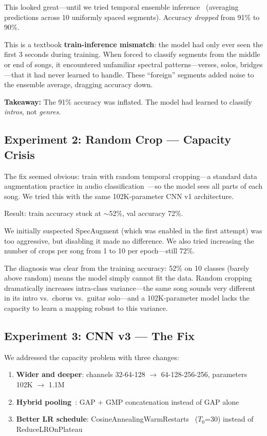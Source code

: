 This looked great---until we tried temporal ensemble inference~\cite{silla2007ensemble} (averaging predictions across 10 uniformly spaced segments). Accuracy \emph{dropped} from 91\% to 90\%.

This is a textbook \textbf{train-inference mismatch}: the model had only ever seen the first 3 seconds during training. When forced to classify segments from the middle or end of songs, it encountered unfamiliar spectral patterns---verses, solos, bridges---that it had never learned to handle. These ``foreign'' segments added noise to the ensemble average, dragging accuracy down.

\textbf{Takeaway:} The 91\% accuracy was inflated. The model had learned to classify \emph{intros}, not \emph{genres}.

\subsection{Experiment 2: Random Crop --- Capacity Crisis}
\label{sec:evolution}

The fix seemed obvious: train with random temporal cropping---a standard data augmentation practice in audio classification~\cite{dieleman2014end}---so the model sees all parts of each song. We tried this with the same 102K-parameter CNN v1 architecture.

Result: train accuracy stuck at $\sim$52\%, val accuracy 72\%.

We initially suspected SpecAugment (which was enabled in the first attempt) was too aggressive, but disabling it made no difference. We also tried increasing the number of crops per song from 1 to 10 per epoch---still 72\%.

The diagnosis was clear from the training accuracy: 52\% on 10 classes (barely above random) means the model simply cannot fit the data. Random cropping dramatically increases intra-class variance---the same song sounds very different in its intro vs.\ chorus vs.\ guitar solo---and a 102K-parameter model lacks the capacity to learn a mapping robust to this variance.

\subsection{Experiment 3: CNN v3 --- The Fix}

We addressed the capacity problem with three changes:

\begin{enumerate}
  \item \textbf{Wider and deeper}: channels 32-64-128 $\to$ 64-128-256-256, parameters 102K $\to$ 1.1M
  \item \textbf{Hybrid pooling}~\cite{woo2018cbam}: GAP + GMP concatenation instead of GAP alone
  \item \textbf{Better LR schedule}: CosineAnnealingWarmRestarts~\cite{loshchilov2017sgdr} ($T_0$=30) instead of ReduceLROnPlateau
\end{enumerate}


